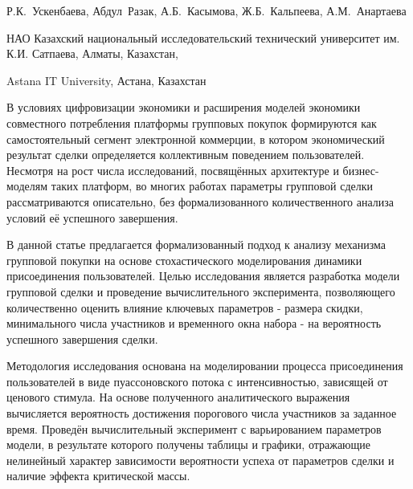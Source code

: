 
\begin{header}

Р.К.~Ускенбаева,
Абдул~Разак,
А.Б.~Касымова\envelope,
Ж.Б.~Кальпеева,
А.М.~Анартаева
\end{header}

\begin{affil}
НАО Казахский национальный исследовательский технический университет им. К.И. Сатпаева, Алматы, Казахстан,

Astana IT University, Астана, Казахстан

\end{affil}

В условиях цифровизации экономики и расширения моделей экономики
совместного потребления платформы групповых покупок формируются как
самостоятельный сегмент электронной коммерции, в котором экономический
результат сделки определяется коллективным поведением пользователей.
Несмотря на рост числа исследований, посвящённых архитектуре и
бизнес-моделям таких платформ, во многих работах параметры групповой
сделки рассматриваются описательно, без формализованного количественного
анализа условий её успешного завершения.

В данной статье предлагается формализованный подход к анализу механизма
групповой покупки на основе стохастического моделирования динамики
присоединения пользователей. Целью исследования является разработка
модели групповой сделки и проведение вычислительного эксперимента,
позволяющего количественно оценить влияние ключевых параметров - размера
скидки, минимального числа участников и временного окна набора - на
вероятность успешного завершения сделки.

Методология исследования основана на моделировании процесса
присоединения пользователей в виде пуассоновского потока с
интенсивностью, зависящей от ценового стимула. На основе полученного
аналитического выражения вычисляется вероятность достижения порогового
числа участников за заданное время. Проведён вычислительный эксперимент
с варьированием параметров модели, в результате которого получены
таблицы и графики, отражающие нелинейный характер зависимости
вероятности успеха от параметров сделки и наличие эффекта критической
массы.

